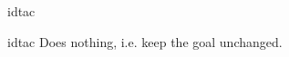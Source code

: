 \begin{tactic}{idtac}
  \begin{tsyntax}[empty]{idtac}
    Does nothing, i.e. keep the goal unchanged.
  \end{tsyntax}
\end{tactic}
